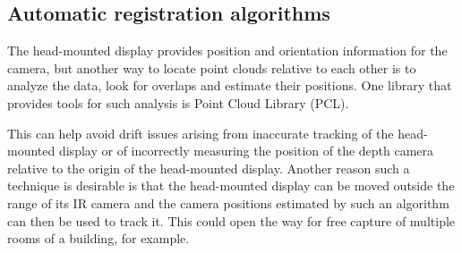 \documentclass[pageno]{jpaper}
\begin{document}
\subsection{Automatic registration algorithms}

The head-mounted display provides position and orientation information for the
camera, but another way to locate point clouds relative to each other is to
analyze the data, look for overlaps and estimate their positions. One library
that provides tools for such analysis is Point Cloud Library (PCL).

This can help avoid drift issues arising from inaccurate tracking of the
head-mounted display or of incorrectly measuring the position of the depth
camera relative to the origin of the head-mounted display. Another reason such a
technique is desirable is that the head-mounted display can be moved outside the
range of its IR camera and the camera positions estimated by such an algorithm
can then be used to track it. This could open the way for free capture of
multiple rooms of a building, for example.

% 
% 
\end{document}
